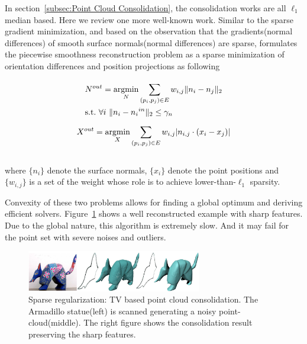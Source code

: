 In section~\ref{subsec:Point Cloud Consolidation}, the consolidation works are all $\ell_1$ median based.
Here we review one more well-known work.
Similar to the sparse gradient minimization, and based on the observation that the gradients(normal differences) of smooth surface normals(normal differences) are sparse,
\cite{avron2010L1} formulates the piecewise smoothness reconstruction problem as a sparse minimization of orientation differences and position projections as following

\small{
\begin{equation}
 \label{eq:TVconsolidation1}
 \begin{aligned}
 &N^{out} =\mathop{\operatorname*{argmin}}_{N} \sum_{(p_{i},p_{j})\in E}^{} w_{i,j}\|n_{i}-n_{j}\|_2\\
 &\mathrm{s.t.}~\forall i~\|n_{i}-{n_{i}}^{in}\|_2\le \gamma_{n}
 \end{aligned}
\end{equation}
}
\small{
\begin{equation}
 \label{eq:TVconsolidation2}
 X^{out} = \mathop{\operatorname*{argmin}}_{X} \sum_{(p_{i},p_{j})\in E}^{} w_{i,j}|n_{i,j}\cdot (x_{i}-x_{j})|
\end{equation}
}
\\
where $\{n_{i}\}$ denote the surface normals, $\{x_{i}\}$ denote the point positions and $\{w_{i,j}\}$ is a set of the weight whose role is to achieve lower-than-$\ell_1$ sparsity.

Convexity of these two problems allows for finding a global optimum and deriving efficient solvers.
Figure~\ref{fig:TV consolidation} shows a well reconstructed example with sharp features.
Due to the global nature, this algorithm is extremely slow.
And it may fail for the point set with severe noises and outliers.

\begin{figure}[ht]
  \centering
  \includegraphics[width=3in]{images/TV_consolidation}
  \caption{Sparse regularization: TV based point cloud consolidation\cite{lipman2007parameterization}. The Armadillo statue(left) is scanned generating a noisy point-cloud(middle). The right figure shows the consolidation result preserving the sharp features.}
  \label{fig:TV consolidation}
\end{figure}



